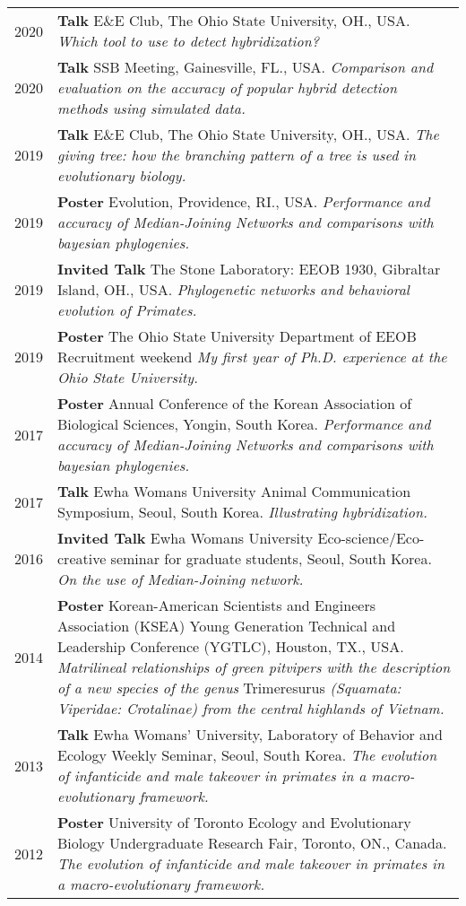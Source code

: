 \documentclass[11pt]{article}
\begin{document}
\begin{longtable}{p{}  p{}}
2020 & \textbf{Talk}  E\&E Club, The Ohio State University, OH., USA. \textit{Which tool to use to detect hybridization?}\\ 
2020 & \textbf{Talk}  SSB Meeting, Gainesville, FL., USA. \textit{Comparison and evaluation on the accuracy of popular hybrid detection methods using simulated data.}\\ 
2019 & \textbf{Talk}  E\&E Club, The Ohio State University, OH., USA. \textit{The giving tree: how the branching pattern of a tree is used in evolutionary biology.}\\
2019 &  \textbf{Poster} Evolution, Providence, RI., USA. \textit{Performance and accuracy of Median-Joining Networks and comparisons with bayesian phylogenies.}\\  
2019 & \textbf{Invited Talk} The Stone Laboratory: EEOB 1930, Gibraltar Island, OH., USA. \textit{Phylogenetic networks and behavioral evolution of Primates.}\\
2019 & \textbf{Poster} The Ohio State University Department of EEOB Recruitment weekend \textit{My first year of Ph.D. experience at the Ohio State University.}\\
2017 & \textbf{Poster} Annual Conference of the Korean Association of Biological Sciences, Yongin, South Korea. \textit{Performance and accuracy of Median-Joining Networks and comparisons with bayesian phylogenies.}\\
2017 & \textbf{Talk} Ewha Womans University Animal Communication Symposium, Seoul, South Korea. \textit{Illustrating hybridization.}\\
2016 & \textbf{Invited Talk} Ewha Womans University Eco-science/Eco-creative seminar for graduate students, Seoul, South Korea. \textit{On the use of Median-Joining network.}\\
2014 & \textbf{Poster} Korean-American Scientists and Engineers Association (KSEA) Young Generation Technical and Leadership Conference (YGTLC), Houston, TX., USA. \textit{Matrilineal relationships of green pitvipers with the description of a new species of the genus} Trimeresurus \textit{(Squamata: Viperidae: Crotalinae) from the central highlands of Vietnam.}\\
2013 & \textbf{Talk} Ewha Womans’ University, Laboratory of Behavior and Ecology Weekly Seminar, Seoul, South Korea. \textit{The evolution of infanticide and male takeover in primates in a macro-evolutionary framework.}\\
2012 & \textbf{Poster} University of Toronto Ecology and Evolutionary Biology Undergraduate Research Fair, Toronto, ON., Canada. \textit{The evolution of infanticide and male takeover in primates in a macro-evolutionary framework.}\\
\end{longtable}
\end{document}
